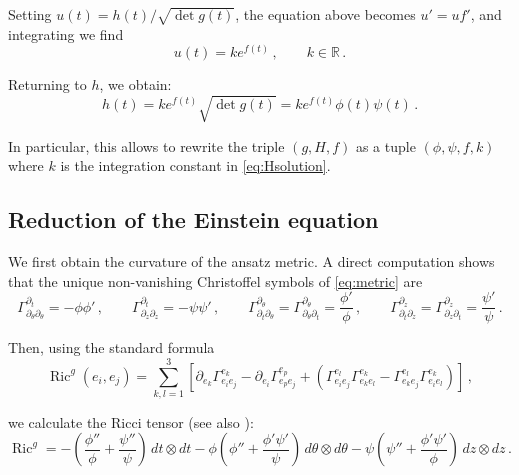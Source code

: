 \documentclass[12pt,a4paper,reqno]{amsart}
\theoremstyle{plain}
\theoremstyle{remark}
\numberwithin{equation}{section}
\newcommand{\R}{\mathbb{R}}
\DeclareMathOperator{\Ric}{\mathrm{Ric}}
\begin{document}
Setting $u(t) = h(t)/\sqrt{\det g(t)}$, the equation above becomes $u' = u f'$, and integrating we find
\begin{equation*}
u(t) = k e^{f(t)} \,, \qquad k \in \R \,.
\end{equation*}

Returning to $h$, we obtain:
\begin{equation}\label{eq:Hsolution}
h(t) = k e^{f(t)} \sqrt{\det g(t)} = k e^{f(t)} \phi(t)\psi(t) \,.
\end{equation}

In particular, this allows to rewrite the triple $(g,H,f)$ as a tuple $(\phi,\psi,f,k)$ where $k$ is the integration constant in \eqref{eq:Hsolution}.


\subsection{Reduction of the Einstein equation}
\label{sec:reduction}

We first obtain the curvature of the ansatz metric. A direct computation shows that the unique non-vanishing Christoffel symbols of \eqref{eq:metric} are  
\begin{equation}\label{eq:christoffel}
\Gamma^{\partial_t}_{\partial_\theta\partial_\theta} = -\phi\phi' \,, \qquad \Gamma^{\partial_t}_{\partial_z\partial_z} = -\psi\psi' \,, \qquad \Gamma^{\partial_\theta}_{\partial_t\partial_\theta} = \Gamma^{\partial_\theta}_{\partial_\theta \partial_t} = \frac{\phi'}{\phi} \,, \qquad \Gamma^{\partial_z}_{\partial_t\partial_z} = \Gamma^{\partial_z}_{\partial_z\partial_t} = \frac{\psi'}{\psi} \,.
\end{equation}

Then, using the standard formula
\begin{equation*}
\Ric^g(e_i,e_j) = \sum_{k,l=1}^3 \left[\partial_{e_k}\Gamma_{e_ie_j}^{e_k} - \partial_{e_i}\Gamma _{e_pe_j}^{e_p} + \left(\Gamma _{e_ie_j}^{e_l}\Gamma_{e_ke_l}^{e_k} - \Gamma_{e_ke_j}^{e_l}\Gamma_{e_ie_l}^{e_k}\right)\right] \,,
\end{equation*}

we calculate the Ricci tensor (see also \cite[\S 4.2.4]{Petersen2016}):
\begin{equation}\label{eq:riccidoublywarped}
\Ric^g = -\left(\frac{\phi''}{\phi} + \frac{\psi''}{\psi}\right) \,dt \otimes dt -\phi\left(\phi'' + \frac{\phi'\psi'}{\psi}\right) \,d\theta \otimes d\theta -\psi\left(\psi'' + \frac{\phi'\psi'}{\phi}\right) \,dz \otimes dz \,.
\end{equation}  
\end{document}
